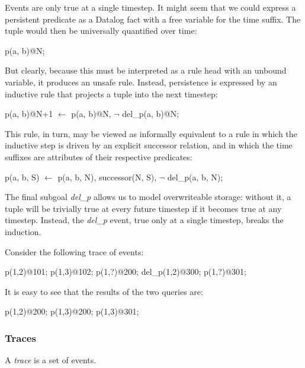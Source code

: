 Events are only true at a single timestep.  It might seem that we could express a persistent predicate as a Datalog fact with a free variable 
for the time suffix.  The tuple would then be universally quantified over time:

\begin{Dedalus}
p(a, b)@N;
\end{Dedalus}

But clearly, because this must be interpreted as a rule head with an unbound variable, it produces an unsafe rule.  Instead, persistence is
expressed by an inductive rule that projects a tuple into the next timestep:

\begin{Dedalus}
p(a, b)@N+1 \(\leftarrow\)
  p(a, b)@N, 
  \(\lnot\) del\_p(a, b)@N;
\end{Dedalus}

This rule, in turn, may be viewed as informally equivalent to a rule in which the inductive step is driven by an 
explicit successor relation, and in which the time suffixes are attributes of their respective predicates:

\begin{Dedalus}
p(a, b, S) \(\leftarrow\)
  p(a, b, N),
  successor(N, S), 
  \(\lnot\) del\_p(a, b, N);
\end{Dedalus}

The final subgoal \emph{del\_p} allows us to model overwriteable storage: without it, a tuple will be trivially true at every future timestep if it becomes true
at any timestep.  Instead, the \emph{del\_p} event, true only at a single timestep, breaks the induction.

Consider the following trace of events:

\begin{Dedalus}
p(1,2)@101;
p(1,3)@102;
p(1,?)@200;
del_p(1,2)@300;
p(1,?)@301;
\end{Dedalus}

It is easy to see that the results of the two queries are:


\begin{Dedalus}
p(1,2)@200;
p(1,3)@200;
p(1,3)@301;
\end{Dedalus}


\subsubsection{Traces}

\begin{definition}
A \emph{trace} is a set of events.
\end{definition}

